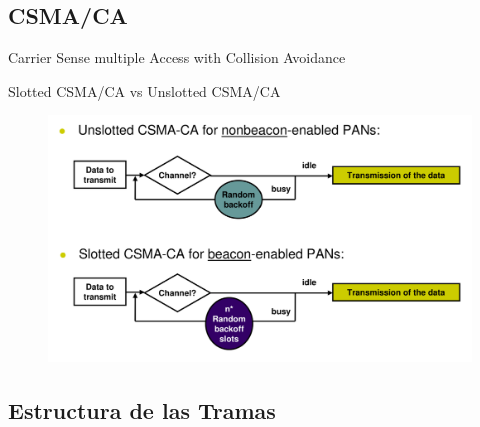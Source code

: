 \documentclass[aspectratio=169, handout]{beamer}
\begin{document}
\subsection[CSMA/CA]{CSMA/CA}

\begin{frame}[T]{Carrier Sense multiple Access with Collision Avoidance}

Slotted CSMA/CA vs Unslotted CSMA/CA

\vspace{10px}

		\begin{figure}[H]
			\includegraphics[height=.8\textheight]{./imagenes/CSMA-CA}\\
		\end{figure}
\end{frame}


\subsection[Tramas]{Estructura de las Tramas}
\end{document}
